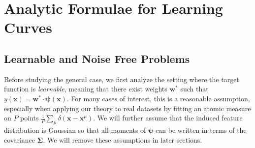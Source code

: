 \documentclass{article} %
\def\x{\bm x}
\def\w{\bm w}
\def\x{\mathbf x}
\def\w{\mathbf w}
\def\bSigma{\mathbf \Sigma}
\begin{document}
\section{Analytic Formulae for Learning Curves}

\subsection{Learnable and Noise Free Problems}\label{sec:learnable_noise_free}

Before studying the general case, we first analyze the setting where the target function is \textit{learnable}, meaning that there exist weights $\w^*$ such that $y(\x) = \w^* \cdot \bm\psi(\x)$. For many cases of interest, this is a reasonable assumption, especially when applying our theory to real datasets by fitting an atomic measure on $P$ points $\frac{1}{P} \sum_{\mu}\delta(\x-\x^\mu)$. We will further assume that the induced feature distribution is Gaussian so that all moments of $\bm\psi$ can be written in terms of the covariance $\bSigma$. We will remove these assumptions in later sections. 
\end{document}
